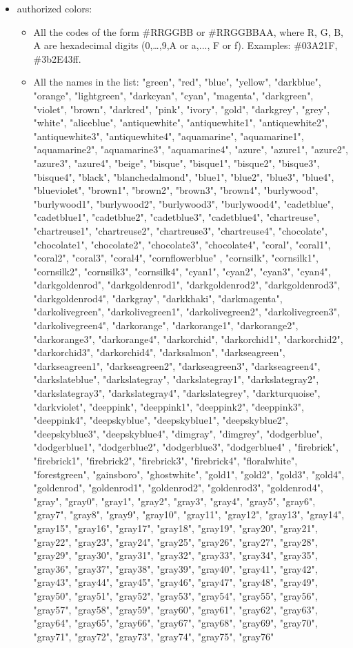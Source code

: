 \begin{itemize}
\item authorized colors:
  \begin{itemize}
  \item All the codes of the form \#RRGGBB or \#RRGGBBAA, where R, G, B, A are hexadecimal digits (0,\dots,9,A or a,..., F or f). Examples: \#03A21F, \#3b2E43ff.
  \item All the names in the list: "green", "red", "blue", "yellow", "darkblue", "orange", "lightgreen", "darkcyan", "cyan", "magenta", "darkgreen", "violet", "brown", "darkred", "pink", "ivory", "gold", "darkgrey", "grey", "white", "aliceblue", "antiquewhite", "antiquewhite1", "antiquewhite2", "antiquewhite3", "antiquewhite4", "aquamarine", "aquamarine1", "aquamarine2", "aquamarine3", "aquamarine4", "azure", "azure1", "azure2", "azure3", "azure4", "beige", "bisque", "bisque1", "bisque2", "bisque3", "bisque4", "black", "blanchedalmond", "blue1", "blue2", "blue3", "blue4", "blueviolet", "brown1", "brown2", "brown3", "brown4", "burlywood", "burlywood1", "burlywood2", "burlywood3", "burlywood4", "cadetblue", "cadetblue1", "cadetblue2", "cadetblue3", "cadetblue4", "chartreuse", "chartreuse1", "chartreuse2", "chartreuse3", "chartreuse4", "chocolate", "chocolate1", "chocolate2", "chocolate3", "chocolate4", "coral", "coral1", "coral2", "coral3", "coral4", "cornflowerblue"
    , "cornsilk", "cornsilk1", "cornsilk2", "cornsilk3", "cornsilk4", "cyan1", "cyan2", "cyan3", "cyan4", "darkgoldenrod", "darkgoldenrod1", "darkgoldenrod2", "darkgoldenrod3", "darkgoldenrod4", "darkgray", "darkkhaki", "darkmagenta", "darkolivegreen", "darkolivegreen1", "darkolivegreen2", "darkolivegreen3", "darkolivegreen4", "darkorange", "darkorange1", "darkorange2", "darkorange3", "darkorange4", "darkorchid", "darkorchid1", "darkorchid2", "darkorchid3", "darkorchid4", "darksalmon", "darkseagreen", "darkseagreen1", "darkseagreen2", "darkseagreen3", "darkseagreen4", "darkslateblue", "darkslategray", "darkslategray1", "darkslategray2", "darkslategray3", "darkslategray4", "darkslategrey", "darkturquoise", "darkviolet", "deeppink", "deeppink1", "deeppink2", "deeppink3", "deeppink4", "deepskyblue", "deepskyblue1", "deepskyblue2", "deepskyblue3", "deepskyblue4", "dimgray", "dimgrey", "dodgerblue", "dodgerblue1", "dodgerblue2", "dodgerblue3", "dodgerblue4"
    , "firebrick", "firebrick1", "firebrick2", "firebrick3", "firebrick4", "floralwhite", "forestgreen", "gainsboro", "ghostwhite", "gold1", "gold2", "gold3", "gold4", "goldenrod", "goldenrod1", "goldenrod2", "goldenrod3", "goldenrod4", "gray", "gray0", "gray1", "gray2", "gray3", "gray4", "gray5", "gray6", "gray7", "gray8", "gray9", "gray10", "gray11", "gray12", "gray13", "gray14", "gray15", "gray16", "gray17", "gray18", "gray19", "gray20", "gray21", "gray22", "gray23", "gray24", "gray25", "gray26", "gray27", "gray28", "gray29", "gray30", "gray31", "gray32", "gray33", "gray34", "gray35", "gray36", "gray37", "gray38", "gray39", "gray40", "gray41", "gray42", "gray43", "gray44", "gray45", "gray46", "gray47", "gray48", "gray49", "gray50", "gray51", "gray52", "gray53", "gray54", "gray55", "gray56", "gray57", "gray58", "gray59", "gray60", "gray61", "gray62", "gray63", "gray64", "gray65", "gray66", "gray67", "gray68", "gray69", "gray70", "gray71", "gray72", "gray73", "gray74", "gray75", "gray76"

\end{itemize}
\end{itemize}
